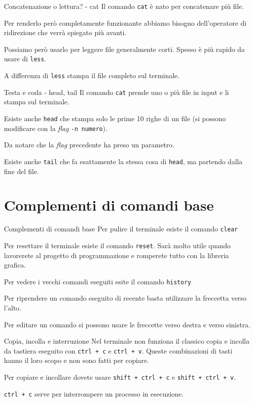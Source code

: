 \documentclass{beamer}
\begin{document}
\begin{frame}{Concatenazione o lettura? - cat}
  Il comando \texttt{cat} è nato per concatenare più file.\bigskip

  Per renderlo però completamente funzionante abbiamo bisogno dell'operatore
  di ridirezione che verrà spiegato più avanti.\bigskip

  Possiamo però usarlo per leggere file generalmente corti. Spesso è più rapido
  da usare di \texttt{less}.\bigskip

  A differenza di \texttt{less} stampa il file completo sul terminale.
\end{frame}

\begin{frame}{Testa e coda - head, tail}
  Il comando \texttt{cat} prende uno o più file in input e li stampa sul 
  terminale.\bigskip

  Esiste anche \texttt{head} che stampa solo le prime 10 righe di un file (si
  possono modificare con la \textit{flag} \texttt{-n numero}).\medskip

  Da notare che la \textit{flag} precedente ha preso un parametro.\bigskip

  Esiste anche \texttt{tail} che fa esattamente la stessa cosa di \texttt{head}, 
  ma partendo dalla fine del file.
\end{frame}

\section{Complementi di comandi base}

\begin{frame}{Complementi di comandi base}
  Per pulire il terminale esiste il comando \texttt{clear}\bigskip

  Per resettare il terminale esiste il comando \texttt{reset}. Sarà molto utile
  quando lavorerete al progetto di programmazione e romperete tutto con 
  la libreria grafica.\bigskip

  Per vedere i vecchi comandi eseguiti esite il comando \texttt{history}\bigskip

  Per riprendere un comando eseguito di recente basta utilizzare la freccetta
  verso l'alto.\bigskip

  Per editare un comando si possono usare le freccette verso destra e verso 
  sinistra.\bigskip
\end{frame}

\begin{frame}{Copia, incolla e interruzione}
  Nel terminale non funziona il classico copia e incolla da tastiera eseguito
  con \texttt{ctrl + c} e \texttt{ctrl + v}. Queste combinazioni di tasti hanno 
  il loro scopo e non sono fatti per copiare.\bigskip

  Per copiare e incollare dovete usare \texttt{shift + ctrl + c} e 
  \texttt{shift + ctrl + v}.\bigskip

  \texttt{ctrl + c} serve per interrompere un processo in esecuzione.
\end{frame}
\end{document}
